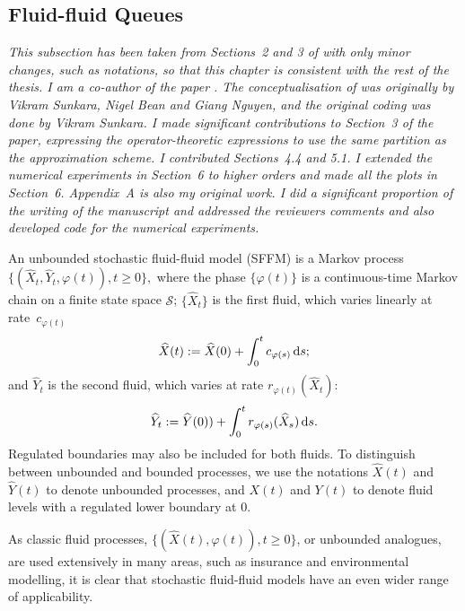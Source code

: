 \subsection{Fluid-fluid Queues}
	\label{sec:prelim}
	\begin{center}
		\begin{minipage}{0.8\textwidth}
			\textit{This subsection has been taken from Sections~2 and 3 of \cite{blnos2022} with only minor changes, such as notations, so that this chapter is consistent with the rest of the thesis. I am a co-author of the paper \cite{blnos2022}. The conceptualisation of \cite{blnos2022} was originally by Vikram Sunkara, Nigel Bean and Giang Nguyen, and the original coding was done by Vikram Sunkara. I made significant contributions to Section~3 of the paper, expressing the operator-theoretic expressions to use the same partition as the approximation scheme. I contributed Sections~4.4 and 5.1. I extended the numerical experiments in Section~6 to higher orders and made all the plots in Section~6. Appendix~A is also my original work. I did a significant proportion of the writing of the manuscript and addressed the reviewers comments and also developed code for the numerical experiments.
			}
		\end{minipage}
		\end{center}

An unbounded stochastic fluid-fluid model (SFFM) is a Markov process $\{(\widehat{X}_t, \widehat{Y}_t, \varphi(t)),t \geq 0\},$ where the phase $\{\varphi(t)\}$ is a continuous-time Markov chain on a finite state space $\mathcal{S}$;  $\{\widehat{X}_t\}$ is the first fluid, which varies linearly at rate~$c_{\varphi(t)}$
% 
\begin{align*} 
	\widehat X(t) := \widehat X(0) + \int_0^t c_{\varphi(s)} \, \mathrm{d} s;
\end{align*} 
% 
and $\widehat{Y}_t$ is the second fluid, which varies at rate $r_{\varphi(t)}(\widehat{X}_t)$:
% 
\begin{align*} 
	\widehat{Y}_t := \widehat Y(0)) + \int_0^t r_{\varphi(s)}(\widehat{X}_s) \, \mathrm{d} s.
\end{align*} 
% 
Regulated boundaries may also be included for both fluids. To distinguish between unbounded and bounded processes, we use the notations \(\widehat X(t)\) and \(\widehat Y(t)\) to denote unbounded processes, and \(X(t)\) and \(Y(t)\) to denote fluid levels with a regulated lower boundary at 0.

As classic fluid processes, $\{(\widehat X(t), \varphi(t)),t \geq 0\}$, or unbounded analogues, are used extensively in many areas, such as insurance and environmental modelling, it is clear that stochastic fluid-fluid models have an even wider range of applicability. 

